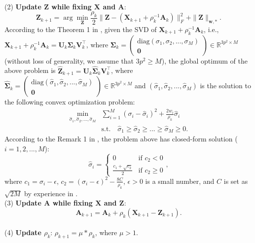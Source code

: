 \\
(2) \textbf{Update $\mathbf{Z}$ while fixing $\mathbf{X}$ and $\mathbf{A}$}:
\begin{equation}
\label{e14}
\mathbf{Z}_{k+1}
=
\arg\min_{\mathbf{Z}}\frac{\rho_{k}}{2}
\|\mathbf{Z} - (\mathbf{X}_{k+1}+\rho_{k}^{-1}\mathbf{A}_{k})\|_{F}^{2}
+
\|\mathbf{Z}\|_{\bm{w},*}.
\end{equation}
According to the Theorem 1 in \cite{wnnmijcv}, given the SVD of $\mathbf{X}_{k+1}+\rho_{k}^{-1}\mathbf{A}_{k}$, i.e., $\mathbf{X}_{k+1}+\rho_{k}^{-1}\mathbf{A}_{k}=\mathbf{U}_{k}\mathbf{\Sigma}_{k}\mathbf{V}_{k}^{\top}$, where 
$\mathbf{\Sigma}_{k}=
\left( \begin{array}{c}
\text{diag}(\sigma_{1},\sigma_{2},...,\sigma_{M})
\\
\mathbf{0}
\end{array} \right)
\in\mathbb{R}^{3p^{2}\times M}$ (without loss of generality, we assume that $3p^{2}\ge M$),
the global optimum of the above problem is 
$\hat{\mathbf{Z}}_{k+1}=\mathbf{U}_{k}\hat{\mathbf{\Sigma}}_{k}\mathbf{V}_{k}^{\top}$, where 
$\hat{\mathbf{\Sigma}}_{k}=
\left( \begin{array}{c}
\text{diag}(\hat{\sigma}_{1},\hat{\sigma}_{2},...,\hat{\sigma}_{M})
\\
\mathbf{0}
\end{array} \right)
\in\mathbb{R}^{3p^{2}\times M}$
and $(\hat{\sigma}_{1},\hat{\sigma}_{2},...,\hat{\sigma}_{M})$ is the solution to the following convex optimization problem:
\begin{equation}
\label{e15}
\begin{split}
\min_{\hat{\sigma}_{1},\hat{\sigma}_{2},...,\hat{\sigma}_{M}}
&
\sum\nolimits_{i=1}^{M}
(\sigma_{i}-\hat{\sigma}_{i})^{2}
+
\frac{2w_{i}}{\rho_{k}}\hat{\sigma}_{i}
\\
&
\text{s.t.}
\quad
\hat{\sigma}_{1}\ge \hat{\sigma}_{2} \ge...\ge \hat{\sigma}_{M}\ge 0.
\end{split}
\end{equation}
According to the Remark 1 in \cite{wnnmijcv}, the problem above has closed-form solution ($i=1,2,...,M$):
\begin{equation}
\label{e16}
\hat{\sigma}_{i}
=
\left\{ \begin{array}{ll}
0 & \textrm{if $c_{2}<0$}\\
\frac{c_{1}+\sqrt{c_{2}}}{2} & \textrm{if $c_{2}\ge 0$}
\end{array} \right.,
\end{equation}
where $c_{1}=\sigma_{i}-\epsilon$, $c_{2} = (\sigma_{i}-\epsilon)^{2}-\frac{8C}{\rho_{k}}$, $\epsilon>0$ is a small number, and $C$ is set as $\sqrt{2M}$ by experience in \cite{wnnmijcv}.
 \\
(3) \textbf{Update $\mathbf{A}$ while fixing $\mathbf{X}$ and $\mathbf{Z}$}:
\begin{equation}
\label{e17}
\mathbf{A}_{k+1}
=
\mathbf{A}_{k} + \rho_{k}(\mathbf{X}_{k+1}-\mathbf{Z}_{k+1}).
\end{equation}
\\
(4) \textbf{Update $\rho_{k}$}: $\rho_{k+1}= \mu * \rho_{k}$, where $\mu>1$.


